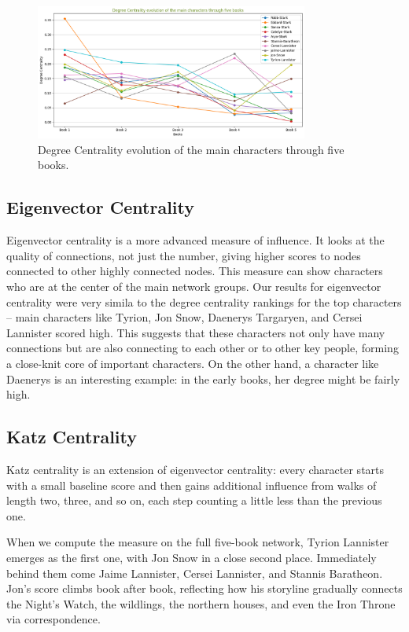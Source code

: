\documentclass[12pt, a4paper]{article}
\begin{document}
      \begin{figure}[htbp]
            \centering
            \includegraphics[width=0.8\textwidth]{deg-cent-evolution.png}
            \caption{Degree Centrality evolution of the main characters through five books.}
            \label{fig:deg_cent_evolution}
            \end{figure}
      \FloatBarrier
\subsection*{Eigenvector Centrality}
Eigenvector centrality is a more advanced measure of influence.
 It looks at the quality of connections, not just the number, 
 giving higher scores to nodes connected to other highly connected nodes.
  This measure can show 
   characters who are at the center of the main network groups. 
   Our results for eigenvector centrality were very simila
    to the degree centrality rankings for the top characters 
    – main characters like Tyrion, Jon Snow, Daenerys Targaryen,
     and Cersei Lannister scored high. This suggests that 
     these characters not only have many connections but are also
      connecting to each other or to other key people, forming a 
      close-knit core of important characters. On the other hand,
       a character like Daenerys is an interesting example: in 
       the early books, her degree might be fairly high.

\subsection*{Katz Centrality}
Katz centrality is an extension of eigenvector centrality:
 every character starts with a small baseline score and then
  gains additional influence from walks of length two, three, 
  and so on, each step counting a little less than the previous one. 
  

When we compute the measure on the full five-book network, 
Tyrion Lannister emerges as the first one,
 with Jon Snow in a close second place. 
 Immediately behind them come Jaime Lannister, 
 Cersei Lannister, and Stannis Baratheon. Jon's score climbs book 
 after book, reflecting how his storyline gradually connects the 
 Night's Watch, the wildlings, the northern houses, and even the 
 Iron Throne via correspondence. 
\end{document}
